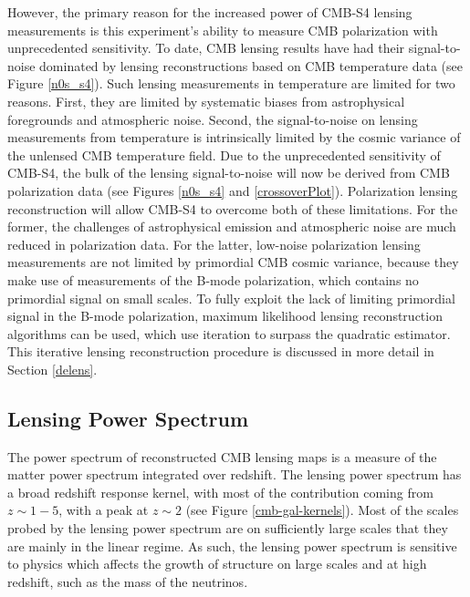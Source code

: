 However, the primary reason for the increased power of CMB-S4 lensing measurements is this experiment's ability to measure CMB polarization with unprecedented sensitivity. To date, CMB lensing results have had their signal-to-noise dominated by lensing reconstructions based on CMB temperature data (see Figure \ref{n0s_s4}). Such lensing measurements in temperature are limited for two reasons. First, they are limited by systematic biases from astrophysical foregrounds and atmospheric noise. Second, the signal-to-noise on lensing measurements from temperature is intrinsically limited by the cosmic variance of the unlensed CMB temperature field. Due to the unprecedented sensitivity of CMB-S4, the bulk of the lensing signal-to-noise will now be derived from CMB polarization data (see Figures \ref{n0s_s4} and \ref{crossoverPlot}).  Polarization lensing reconstruction will allow CMB-S4 to overcome both of these limitations. For the former, the challenges of astrophysical emission and atmospheric noise are much reduced in polarization data. For the latter, low-noise polarization lensing measurements are not limited by primordial CMB cosmic variance, because they make use of measurements of the B-mode polarization, which contains no primordial signal on small scales. To fully exploit the lack of limiting primordial signal in the B-mode polarization, maximum likelihood lensing reconstruction algorithms can be used, which use iteration to surpass the quadratic estimator. This iterative lensing reconstruction procedure is discussed in more detail in Section \ref{delens}.   


\subsection{Lensing Power Spectrum}\label{kappaPower}

The power spectrum of reconstructed CMB lensing maps is a measure of the matter power spectrum integrated over redshift.  The lensing power spectrum has a broad redshift response kernel, with most of the contribution coming from $z\sim 1-5$, with a peak at $z\sim 2$ (see Figure \ref{cmb-gal-kernels}).  
Most of the scales probed by the lensing power spectrum are on sufficiently
large scales that they are mainly in the linear regime.  As such, the lensing power spectrum is sensitive to physics which affects the growth of structure on large scales and at high redshift, such as the mass of the neutrinos. 


